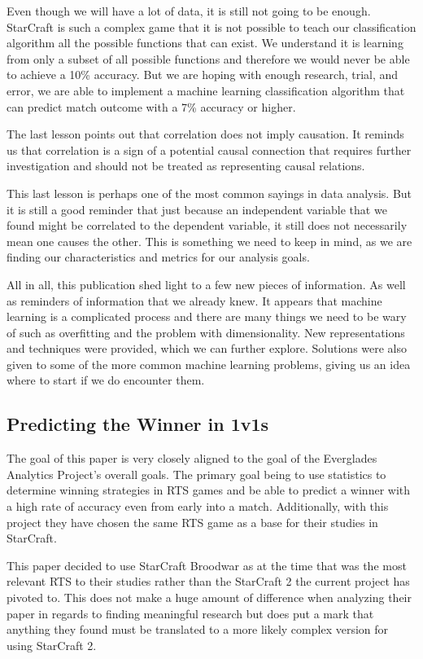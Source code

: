 \documentclass[a4paper,12pt]{report}
\begin{document}
Even though we will have a lot of data, it is still not going to be enough. StarCraft is such a complex game that it is not possible to teach our classification algorithm all the possible functions that can exist. We understand it is learning from only a subset of all possible functions and therefore we would never be able to achieve a 10\% accuracy. But we are hoping with enough research, trial, and error, we are able to implement a machine learning classification algorithm that can predict match outcome with a 7\% accuracy or higher.

The last lesson points out that correlation does not imply causation. It reminds us that correlation is a sign of a potential causal connection that requires further investigation and should not be treated as representing causal relations.

This last lesson is perhaps one of the most common sayings in data analysis. But it is still a good reminder that just because an independent variable that we found might be correlated to the dependent variable, it still does not necessarily mean one causes the other. This is something we need to keep in mind, as we are finding our characteristics and metrics for our analysis goals.

All in all, this publication shed light to a few new pieces of information. As well as reminders of information that we already knew. It appears that machine learning is a complicated process and there are many things we need to be wary of such as overfitting and the problem with dimensionality. New representations and techniques were provided, which we can further explore. Solutions were also given to some of the more common machine learning problems, giving us an idea where to start if we do encounter them.

\subsection{Predicting the Winner in 1v1s}

The goal of this paper is very closely aligned to the goal of the Everglades Analytics Project’s overall goals. The primary goal being to use statistics to determine winning strategies in RTS games and be able to predict a winner with a high rate of accuracy even from early into a match. Additionally, with this project  they have chosen the same RTS game as a base for their studies in StarCraft.

This paper decided to use StarCraft Broodwar as at the time that was the most relevant RTS to their studies rather than the StarCraft 2 the current project has pivoted to. This does not make a huge amount of difference when analyzing their paper in regards to finding meaningful research but does put a mark that anything they found must be translated to a more likely complex version for using StarCraft 2.
\end{document}
